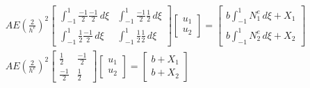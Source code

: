 \documentclass[a4paper,11pt,oneside]{article}
\begin{document}
\begin{align*}
  AE \left(\frac{2}{h^e}\right)^2
  \left[
    \begin{array}{cc}
      \int_{-1}^{1} \frac{-1}{2}\frac{-1}{2} \,d\!\xi &
      \int_{-1}^{1} \frac{-1}{2}\frac{1}{2}  \,d\!\xi \\
      \int_{-1}^{1} \frac{1}{2} \frac{-1}{2} \,d\!\xi &
      \int_{-1}^{1} \frac{1}{2} \frac{1}{2}  \,d\!\xi
   \end{array}
    \right]
\left[
  \begin{array}{c}
    u_1 \\ u_2
  \end{array}
\right] =
\left[
  \begin{array}{c}
   b \int_{-1}^{1}N_1^e \,d\!\xi + X_1 \\
   b \int_{-1}^{1}N_2^e \,d\!\xi + X_2
  \end{array}
\right]\\
  AE \left(\frac{2}{h^e}\right)^2
  \left[
    \begin{array}{cc}
      \frac{1}{2}  &
      \frac{-1}{2} \\
      \frac{-1}{2} &
      \frac{1}{2}
   \end{array}
    \right]
\left[
  \begin{array}{c}
    u_1 \\ u_2
  \end{array}
\right] =
\left[
  \begin{array}{c}
   b + X_1 \\
   b + X_2
  \end{array}
\right]
\end{align*}
\end{document}
